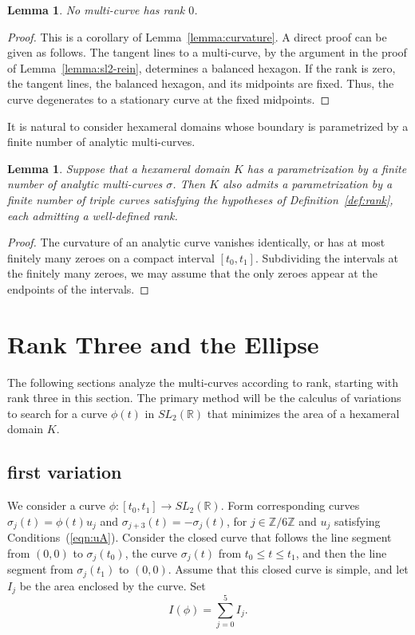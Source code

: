 \documentclass[11pt]{amsart}
\newtheorem{lemma}[equation]{Lemma}
\newcommand{\ring}[1]{\mathbb{#1}}
\begin{document}
\begin{lemma}
No multi-curve has rank $0$.
\end{lemma}

\begin{proof} This is a corollary of Lemma~\ref{lemma:curvature}.  A
  direct proof can be given as follows.  The tangent lines to a
  multi-curve, by the argument in the proof of
  Lemma~\ref{lemma:sl2-rein}, determines a balanced hexagon.  If the
  rank is zero, the tangent lines, the balanced hexagon, and its
  midpoints are fixed.  Thus, the curve degenerates to a stationary
  curve at the fixed midpoints.
\end{proof}

It is natural to consider hexameral domains whose boundary is
parametrized by a finite number of  analytic multi-curves.  

\begin{lemma} Suppose that a hexameral domain $K$ has a
  parametrization by a finite number of analytic multi-curves
  $\sigma$.  Then $K$ also admits a parametrization by a finite number
  of triple curves satisfying the hypotheses of
  Definition~\ref{def:rank}, each admitting a well-defined rank.
\end{lemma}

\begin{proof} The curvature of an analytic curve vanishes identically,
or has at most finitely many zeroes on a compact interval $[t_0,t_1]$.
Subdividing the intervals at the finitely many zeroes, we may assume
that the only zeroes appear at the endpoints of the intervals.
\end{proof}




\section{Rank Three and the Ellipse}

The following sections analyze the multi-curves according to rank,
starting with rank three in this section.
The primary method will be the calculus of variations  
to search for a curve $\phi(t)$ in $SL_2(\ring{R})$ that 
minimizes the area of a hexameral domain $K$.  

\subsection{first variation}

We consider a curve $\phi:[t_0,t_1]\to SL_2(\ring{R})$.
Form corresponding curves $\sigma_j(t) = \phi(t) u_j$ and
$\sigma_{j+3}(t) = -\sigma_j(t)$, for $j\in\ring{Z}/6\ring{Z}$ and
$u_j$ satisfying Conditions~(\ref{eqn:uA}).  Consider the closed curve
that follows the line segment from $(0,0)$ to $\sigma_j(t_0)$, the
curve $\sigma_j(t)$ from $t_0\le t\le t_1$, and then the line segment
from $\sigma_j(t_1)$ to $(0,0)$.  Assume that this closed curve is
simple, and let $I_j$ be the area enclosed by the curve.  Set
\[
I(\phi) =\sum_{j=0}^5 I_j.
\]
\end{document}
